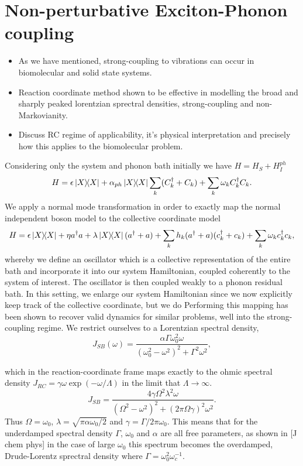 \documentclass[]{article}
\begin{document}
\section{Non-perturbative Exciton-Phonon coupling}
\begin{itemize}
	\item As we have mentioned, strong-coupling to vibrations can occur in biomolecular and solid state systems.
	\item Reaction coordinate method shown to be effective in modelling the broad and sharply peaked lorentzian sprectral densities, strong-coupling and non-Markovianity.
	\item Discuss RC regime of applicability, it's physical interpretation and precisely how this applies to the biomolecular problem.
\end{itemize}

 Considering only the system and phonon bath initially we have $H = H_S + H_I^{ph}$
\begin{equation}
H = \epsilon \dyad{X} + \alpha_{ph}\dyad{X}\sum_{k}(C^{\dagger}_k+C_k) + \sum_{k}\omega_k C^{\dagger}_k C_k.
\end{equation}
We apply a normal mode transformation in order to exactly map the normal independent boson model to the collective coordinate model
\begin{equation}
H = \epsilon \dyad{X} + \eta a^{\dagger}a + \lambda\dyad{X}(a^{\dagger}+a) + \sum_{k}h_k(a^{\dagger}+a)(c^{\dagger}_k+c_k) + \sum_{k}\omega_k c^{\dagger}_k c_k,
\end{equation}
whereby we define an oscillator which  is a collective representation of the entire bath and incorporate it into our system Hamiltonian, coupled coherently to the system of interest. The oscillator is then coupled weakly to a phonon residual bath. In this setting, we enlarge our system Hamiltonian since we now explicitly keep track of the collective coordinate, but we do Performing this mapping has been shown to recover valid dynamics for similar problems, well into the strong-coupling regime.
We restrict ourselves to a Lorentzian spectral density, 
\begin{equation}
\label{eq:DrudeLorentzUnderdamped}
J_{SB}(\omega) = \frac{\alpha \Gamma \omega_0^2\omega}{(\omega_0^2-\omega^2)^2 + \Gamma^2\omega^2},
\end{equation}

which in the reaction-coordinate frame maps exactly to the ohmic spectral density $J_{RC} = \gamma \omega \exp(-\omega/\Lambda)$ in the limit that $\Lambda\to\infty$.
\begin{equation}
\label{eq:DrudeLorentzUnderdamped1}
J_{SB}  = \frac{4\gamma\Omega^2\lambda^2\omega}{(\Omega^2-\omega^2)^2 + (2\pi\Omega\gamma)^2\omega^2}.
\end{equation}
Thus $\Omega = \omega_0$, $\lambda=\sqrt{\pi \alpha \omega_0/2}$ and $\gamma=\Gamma/2\pi\omega_0$. This means that for the underdamped spectral density $\Gamma$, $\omega_0$ and $\alpha$ are all free parameters, as shown in [J chem phys] in the case of large $\omega_0$ this spectrum becomes the overdamped, Drude-Lorentz sprectral density where $\Gamma=\omega_0^2\omega_c^{-1}$.
\end{document}
